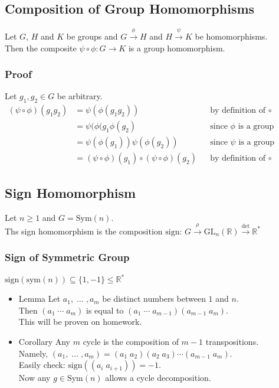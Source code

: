 \documentclass[11pt]{article}
\newcommand{\0}{\emptyset}
\newcommand{\R}{\mathbb{R}}
\begin{document}
\subsection*{Composition of Group Homomorphisms}
\label{sec:orgcb55a91}
Let \(G\), \(H\) and \(K\) be groups and \(G\overset{\phi}{\to}H\) and \(H\overset{\psi}{\to}K\) be homomorphisms.\\[0pt]
Then the composite \(\psi\circ\phi:G\to K\) is a group homomorphism.\\[0pt]
\subsubsection*{Proof}
\label{sec:orgc1523af}
Let \(g_{1},g_{2}\in G\) be arbitrary.\\[0pt]
\begin{align*}
  (\psi\circ\phi)(g_{1}g_{2})
  &=\psi(\phi(g_{1}g_{2})) && \text{by definition of }\circ
  \\&=\psi(\phi(g_{1}\phi(g_{2}) && \text{since $\phi$ is a group homomorphism}
  \\&=\psi(\phi(g_{1}))\psi(\phi(g_{2})) && \text{since $\psi$ is a group homomorphism}
  \\&=(\psi\circ\phi)(g_{1})\circ(\psi\circ\phi)(g_{2}) && \text{by definition of }\circ
\end{align*}
\subsection*{Sign Homomorphism}
\label{sec:orgb2cd4ec}
Let \(n\geq1\) and \(G=\text{Sym}(n)\).\\[0pt]
Ths sign homomorphism is the composition \(\text{sign: }G\overset{\rho}{\to}\text{GL}_{n}(\R)\overset{\det}{\to}\R^{*}\)\\[0pt]
\subsubsection*{Sign of Symmetric Group}
\label{sec:org0545f7f}
\(\text{sign}(\text{sym}(n))\subseteq\{1,-1\}\leq\R^{*}\)\\[0pt]
\begin{itemize}
\item Lemma
\label{sec:orgb0b9dcc}
Let \(a_{1},\;\ldots\;,a_{m}\) be distinct numbers between \(1\) and \(n\).\\[0pt]
Then \((a_{1}\;\cdots\;a_{m})\) is equal to \((a_{1}\;\cdots\;a_{m-1})(a_{m-1}\;a_{m})\).\\[0pt]
This will be proven on homework.\\[0pt]
\item Corollary
\label{sec:orgd738a87}
Any \(m\) cycle is the composition of \(m-1\) transpositions.\\[0pt]
Namely, \((a_{1},\;\ldots\;,a_{m})=(a_{1}\;a_{2})(a_{2}\;a_{3})\cdots(a_{m-1}\;a_{m})\).\\[0pt]
Easily check: \(\text{sign}((a_{i}\;a_{i+1}))=-1\).\\[0pt]
Now any \(g\in\text{Sym}(n)\) allows a cycle decomposition.\\[0pt]
\end{itemize}
\end{document}
